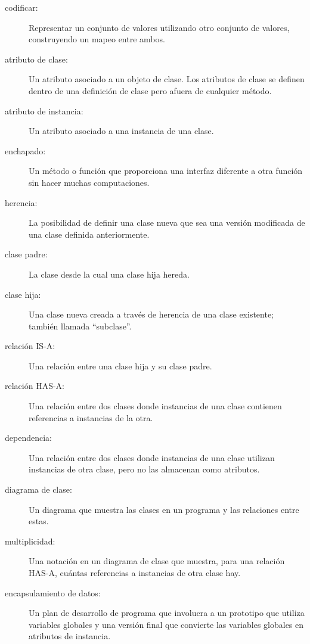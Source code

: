 \documentclass[10pt]{book}
\begin{document}
\begin{description}

\item[codificar:]  Representar un conjunto de valores utilizando otro
conjunto de valores, construyendo un mapeo entre ambos.

\item[atributo de clase:] Un atributo asociado a un objeto
de clase.  Los atributos de clase se definen dentro de una
definición de clase pero afuera de cualquier método.

\item[atributo de instancia:] Un atributo asociado a
una instancia de una clase.

\item[enchapado:] Un método o función que proporciona una interfaz
diferente a otra función sin hacer muchas computaciones.

\item[herencia:] La posibilidad de definir una clase nueva que sea una
versión modificada de una clase definida anteriormente.

\item[clase padre:] La clase desde la cual una clase hija hereda.

\item[clase hija:] Una clase nueva creada a través de herencia de una
clase existente; también llamada ``subclase''.

\item[relación IS-A:] Una relación entre una clase hija
y su clase padre.

\item[relación HAS-A:] Una relación entre dos clases
donde instancias de una clase contienen referencias a instancias de
la otra.

\item[dependencia:] Una relación entre dos clases
donde instancias de una clase utilizan instancias de otra clase,
pero no las almacenan como atributos.

\item[diagrama de clase:] Un diagrama que muestra las clases en un programa
y las relaciones entre estas.

\item[multiplicidad:] Una notación en un diagrama de clase que muestra, para
una relación HAS-A, cuántas referencias a instancias
de otra clase hay.

\item[encapsulamiento de datos:]  Un plan de desarrollo de programa que
involucra a un prototipo que utiliza variables globales y una versión final
que convierte las variables globales en atributos de instancia.

\end{description}
\end{document}
